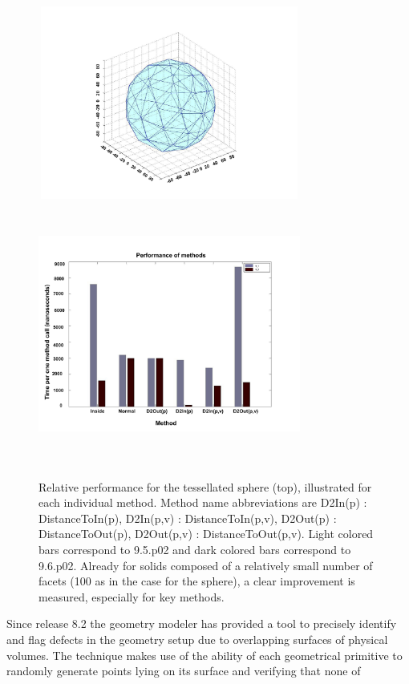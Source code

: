 \begin{figure}
\centering \includegraphics[height=2.5in,width=3.4in]{figures/NewSphere.pdf}
\centering \includegraphics[height=3.4in,width=3.4in]{figures/tessellated_cpu.pdf}
\caption{Relative performance for the tessellated sphere (top), illustrated for
         each individual method.  Method name abbreviations are 
         D2In(p) : DistanceToIn(p), D2In(p,v) : DistanceToIn(p,v),
         D2Out(p) : DistanceToOut(p),  D2Out(p,v) : DistanceToOut(p,v).
         Light colored bars correspond to \Gfour{} 9.5.p02 and dark colored bars 
         correspond to \Gfour{} 9.6.p02.  Already for solids composed of a 
         relatively small number of facets (100 as in the case for the sphere), a 
         clear improvement is measured, especially for key methods.}
\label{tessellated_cpu}
\end{figure}
Since release 8.2 the geometry modeler has provided a tool to precisely identify
and flag defects in the geometry setup due to overlapping surfaces of physical 
volumes.  The technique makes use of the ability of each geometrical primitive
to randomly generate points lying on its surface and verifying that none of

